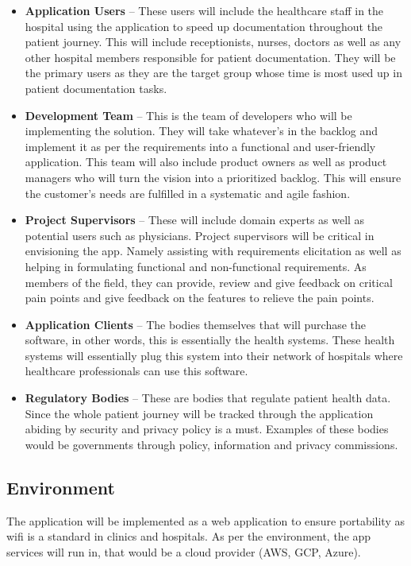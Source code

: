 \documentclass{article}
\begin{document}
\begin{itemize}
\item \textbf{Application Users} -- These users will include the healthcare staff in the hospital using the application to speed up documentation throughout the patient journey. This will include receptionists, nurses, doctors as well as any other hospital members responsible for patient documentation. They will be the primary users as they are the target group whose time is most used up in patient documentation tasks.
\item \textbf{Development Team} -- This is the team of developers who will be implementing the solution. They will take whatever’s in the backlog and implement it as per the requirements into a functional and user-friendly application. This team will also include product owners as well as product managers who will turn the vision into a prioritized backlog. This will ensure the customer's needs are fulfilled in a systematic and agile fashion.
\item \textbf{Project Supervisors} -- These will include domain experts as well as potential users such as physicians. Project supervisors will be critical in envisioning the app. Namely assisting with requirements elicitation as well as helping in formulating functional and non-functional requirements. As members of the field, they can provide, review and give feedback on critical pain points and give feedback on the features to relieve the pain points.
\item \textbf{Application Clients} -- The bodies themselves that will purchase the software, in other words, this is essentially the health systems. These health systems will essentially plug this system into their network of hospitals where healthcare professionals can use this software.
\item \textbf{Regulatory Bodies} -- These are bodies that regulate patient health data. Since the whole patient journey will be tracked through the application abiding by security and privacy policy is a must. Examples of these bodies would be governments through policy, information and privacy commissions.
\end{itemize}

\subsection{Environment}

The application will be implemented as a web application to ensure portability as wifi is a standard in clinics and hospitals. As per the environment, the app services will run in, that would be a cloud provider (AWS, GCP, Azure). 
\end{document}
